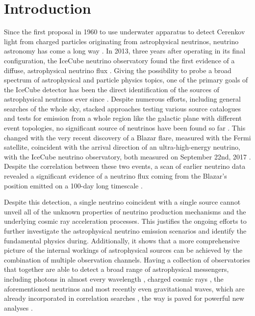 \chapter{Introduction}

Since the first proposal in  1960 to use underwater apparatus to detect Cerenkov light from charged particles originating from astrophysical neutrinos, neutrino astronomy has come a long way \cite{Markov:1960vja}.
In 2013, three years after operating in its final configuration, the IceCube neutrino observatory found the first evidence of a diffuse, astrophysical neutrino flux \cite{Aartsen:2013jdh,Aartsen:2016nxy}.
Giving the possibility to probe a broad spectrum of astrophysical and particle physics topics, one of the primary goals of the IceCube detector has been the direct identification of the sources of astrophysical neutrinos ever since \cite{Katz:2011ke,GOLDSCHMIDT:2002ICScienceGoals}.
Despite numerous efforts, including general searches of the whole sky, stacked approaches testing various source catalogues and tests for emission from a whole region like the galactic plane with different event topologies, no significant source of neutrinos have been found so far \cite{Ahlers:2014ioa,Aartsen:2016oji,Aartsen:2013jdh,Aartsen:2016qcr,Adrian-Martinez:2015ver,Aartsen:2016tpb,IceCube:2018cha,Aartsen:2015dml,Abbasi:2009kq,Aartsen:2014PS4yrs,Aartsen:2015wto}.
This changed with the very recent discovery of a Blazar flare, measured with the Fermi satellite, coincident with the arrival direction of an ultra-high-energy neutrino, with the IceCube neutrino observatory, both measured on September 22nd, 2017 \cite{Keivani:2018rnh}.
Despite the correlation between these two events, a scan of earlier neutrino data revealed a significant evidence of a neutrino flux coming from the Blazar's position emitted on a 100-day long timescale \cite{IceCube:2018cha}.

Despite this detection, a single neutrino coincident with a single source cannot unveil all of the unknown properties of neutrino production mechanisms and the underlying cosmic ray acceleration processes.
This justifies the ongoing efforts to further investigate the astrophysical neutrino emission scenarios and identify the fundamental physics during.
Additionally, it shows that a more comprehensive picture of the internal workings of astrophysical sources can be achieved by the combination of multiple observation channels.
Having a collection of observatories that together are able to detect a broad range of astrophysical messengers, including photons in almost every wavelength \cite{Huber:2016Photons}, charged cosmic rays \cite{BLANDFORD:2014CRs,Sommers:2009CRs}, the aforementioned neutrinos and most recently even gravitational waves, which are already incorporated in correlation searches \cite{Abbott:2016blz,Adrian-Martinez:2016xgn}, the way is paved for powerful new analyses \cite{Branchesi:2016MultiMessenger}.

